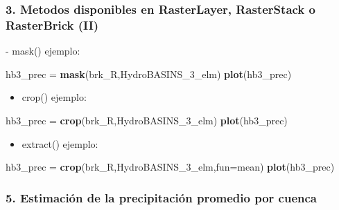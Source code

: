 \documentclass[]{article}
\newenvironment{Shaded}{\begin{snugshade}}{\end{snugshade}}
\newcommand{\KeywordTok}[1]{\textcolor[rgb]{0.13,0.29,0.53}{\textbf{#1}}}
\newcommand{\DataTypeTok}[1]{\textcolor[rgb]{0.13,0.29,0.53}{#1}}
\newcommand{\StringTok}[1]{\textcolor[rgb]{0.31,0.60,0.02}{#1}}
\newcommand{\OtherTok}[1]{\textcolor[rgb]{0.56,0.35,0.01}{#1}}
\newcommand{\ControlFlowTok}[1]{\textcolor[rgb]{0.13,0.29,0.53}{\textbf{#1}}}
\newcommand{\OperatorTok}[1]{\textcolor[rgb]{0.81,0.36,0.00}{\textbf{#1}}}
\newcommand{\NormalTok}[1]{#1}
\providecommand{\tightlist}{%
  \setlength{\itemsep}{0pt}\setlength{\parskip}{0pt}}
\begin{document}
\subsubsection{3. Metodos disponibles en RasterLayer, RasterStack o
RasterBrick
(II)}\label{metodos-disponibles-en-rasterlayer-rasterstack-o-rasterbrick-ii}

 - mask() ejemplo:

\begin{Shaded}
\begin{Highlighting}[]
\NormalTok{hb3_prec =}\StringTok{ }\KeywordTok{mask}\NormalTok{(brk_R,HydroBASINS_3_elm)}
\KeywordTok{plot}\NormalTok{(hb3_prec)}
\end{Highlighting}
\end{Shaded}

\begin{itemize}
\tightlist
\item
  crop() ejemplo:
\end{itemize}

\begin{Shaded}
\begin{Highlighting}[]
\NormalTok{hb3_prec =}\StringTok{ }\KeywordTok{crop}\NormalTok{(brk_R,HydroBASINS_3_elm)}
\KeywordTok{plot}\NormalTok{(hb3_prec)}
\end{Highlighting}
\end{Shaded}

\begin{itemize}
\tightlist
\item
  extract() ejemplo:
\end{itemize}

\begin{Shaded}
\begin{Highlighting}[]
\NormalTok{hb3_prec =}\StringTok{ }\KeywordTok{crop}\NormalTok{(brk_R,HydroBASINS_3_elm,}\DataTypeTok{fun=}\NormalTok{mean)}
\KeywordTok{plot}\NormalTok{(hb3_prec)}
\end{Highlighting}
\end{Shaded}

\subsubsection{5. Estimación de la precipitación promedio por
cuenca}\label{estimacion-de-la-precipitacion-promedio-por-cuenca}

\begin{Shaded}
\end{Shaded}
\end{document}
